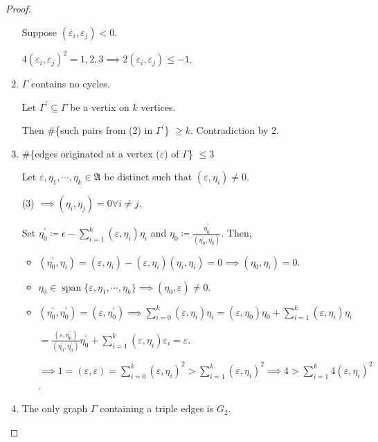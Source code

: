 \documentclass{article}
\theoremstyle{definition}
\begin{document}
\begin{proof}
\begin{enumerate}[label=\arabic*)]
        Suppose \((\varepsilon_i, \varepsilon_j) < 0\).

        \(4(\varepsilon_i, \varepsilon_j)^2 = 1,2,3 \implies 2 (\varepsilon_i, \varepsilon_j) \leq -1\).

        \item \(\Gamma\) contains no cycles.
        
        Let \(\Gamma^{\prime} \subseteq \Gamma\) be a vertix on \(k\) vertices.

        Then \#\{such pairs from (2) in \(\Gamma^{\prime}\)\} \(\geq k\). Contradiction by 2.
        
        \item \#\{edges originated at a vertex (\(\varepsilon\)) of \(\Gamma\)\} \(\leq 3\)
        
        Let \(\varepsilon, \eta_1, \cdots , \eta_k \in \mathfrak{A}\) be distinct such that \((\varepsilon, \eta_i)\neq 0\).

        (3) \(\implies (\eta_i, \eta_j) = 0 \forall i \neq j\).
        
        Set \(\eta_0^{\prime} \coloneqq \epsilon - \sum_{i=1}^k (\varepsilon, \eta_i)\eta_i\) and \(\eta_0 \coloneqq \frac{\eta_0^{\prime}}{(\eta_0^{\prime}, \eta_0^{\prime} )}\). Then,

        \begin{itemize}
            \item \((\eta_0^{\prime} , \eta_i) = (\varepsilon, \eta_i) - (\varepsilon, \eta_i)(\eta_i, \eta_i) = 0 \implies (\eta_0, \eta_i) = 0\).
            \item \(\eta_0 \in \operatorname{span}\{ \varepsilon , \eta_1, \cdots , \eta_k \} \implies (\eta_0, \varepsilon) \neq 0\).
            \item \((\eta_0^{\prime} , \eta_0^{\prime}) = (\varepsilon, \eta_0^{\prime}) \implies \sum_{i=0}^k (\varepsilon, \eta_i) \eta_i = (\varepsilon , \eta_0) \eta_0 + \sum_{i=1}^k (\varepsilon , \eta_i)\eta_i\)
            
            \(= \frac{(\varepsilon, \eta_0^{\prime})}{(\eta_0^{\prime} , \eta_0^{\prime})}\eta_0^{\prime} + \sum_{i=1}^k (\varepsilon , \eta_i) \varepsilon_i = \varepsilon\).

            \(\implies 1 = (\varepsilon, \varepsilon) =\sum_{i=0}^k (\varepsilon, \eta_i)^2 > \sum_{i=1}^k (\varepsilon, \eta_i)^2 \implies 4 > \sum_{i=1}^k 4 (\varepsilon, \eta_i)^2\).
        \end{itemize}
        
        \item The only graph \(\Gamma\) containing a triple edges is \(G_2\).
        

\end{enumerate}
\end{proof}
\end{document}
